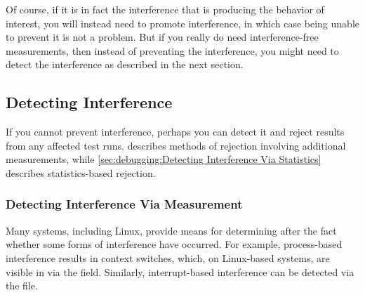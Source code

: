 \QuickQuizEnd

Of course, if it is in fact the interference that is producing the
behavior of interest, you will instead need to promote interference,
in which case being unable to prevent it is not a problem.
But if you really do need interference-free measurements, then instead
of preventing the interference, you might need to detect the interference
as described in the next section.

\subsection{Detecting Interference}
\label{sec:debugging:Detecting Interference}

If you cannot prevent interference, perhaps you can detect it
and reject results from any affected test runs.
describes methods of rejection involving additional measurements,
while \cref{sec:debugging:Detecting Interference Via Statistics}
describes statistics-based rejection.

\subsubsection{Detecting Interference Via Measurement}
\label{sec:debugging:Detecting Interference Via Measurement}


Many systems, including Linux, provide means for determining after the
fact whether some forms of interference have occurred.
For example, process-based interference results in context switches,
which, on Linux-based systems, are visible in
 via the  field.
Similarly, interrupt-based interference can be detected via the
 file.

